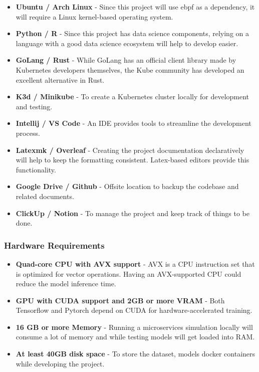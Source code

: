 \begin{itemize}[noitemsep,nolistsep] 
\item \textbf{Ubuntu / Arch Linux} - Since this project will use \ac{ebpf} as a dependency, it will require a Linux kernel-based operating system.
\item \textbf{Python / R} - Since this project has data science components, relying on a language with a good data science ecosystem will help to develop easier.
\item \textbf{GoLang / Rust} - While GoLang has an official client library made by Kubernetes developers themselves, the Kube community has developed an excellent alternative in Rust.
\item \textbf{K3d / Minikube} - To create a Kubernetes cluster locally for development and testing.
\item \textbf{Intellij / VS Code} - An IDE provides tools to streamline the development process.
\item \textbf{Latexmk / Overleaf} - Creating the project documentation declaratively will help to keep the formatting consistent. Latex-based editors provide this functionality.
\item \textbf{Google Drive / Github} - Offsite location to backup the codebase and related documents.
\item \textbf{ClickUp / Notion} - To manage the project and keep track of things to be done.
\end{itemize}

\subsubsection{Hardware Requirements}
\begin{itemize}[noitemsep,nolistsep] 
    \item \textbf{Quad-core CPU with AVX support} - AVX is a CPU instruction set that is optimized for vector operations. Having an AVX-supported CPU could reduce the model inference time.
    \item \textbf{GPU with CUDA support and 2GB or more VRAM} - Both Tensorflow and Pytorch depend on CUDA for hardware-accelerated training.
    \item \textbf{16 GB or more Memory} - Running a microservices simulation locally will consume a lot of memory and while testing models will get loaded into RAM.
    \item \textbf{At least 40GB disk space} - To store the dataset, models docker containers while developing the project.
\end{itemize}

